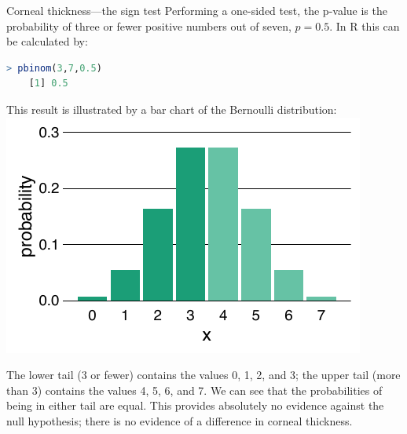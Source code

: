 \begin{example}{Corneal thickness---the sign test}
  Performing a one-sided test, the p-value is the probability of three or fewer positive numbers out of seven, $p=0.5$.
  In R this can be calculated by:
  \begin{lstlisting}[language=R]
    > pbinom(3,7,0.5)
    [1] 0.5
  \end{lstlisting}
  This result is illustrated by a bar chart of the Bernoulli distribution:
  \null\hfill\includegraphics{statistical-theory/figures/example_corneal}\hfill\null
  
  The lower tail (3 or fewer) contains the values 0, 1, 2, and 3; the upper tail (more than 3) contains the values 4, 5, 6, and 7.
  We can see that the probabilities of being in either tail are equal. 
  This provides absolutely no evidence against the null hypothesis;  there is no evidence of a difference in corneal thickness.
\end{example}


